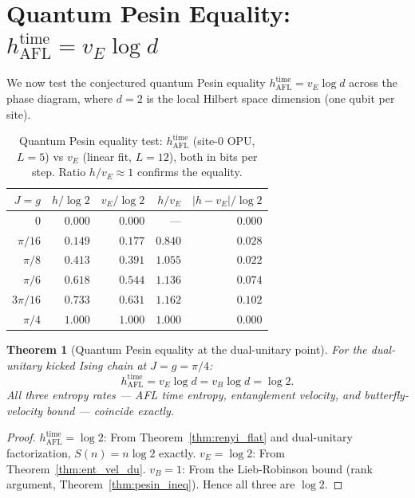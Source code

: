 \documentclass[12pt,a4paper]{article}
\newtheorem{theorem}{Theorem}[section]
\begin{document}
\section{Quantum Pesin Equality: $h_{\mathrm{AFL}}^{\mathrm{time}} = v_E \log d$}
\label{sec:qp_equality}

We now test the conjectured quantum Pesin equality
$h_{\mathrm{AFL}}^{\mathrm{time}} = v_E\log d$ across the phase diagram,
where $d=2$ is the local Hilbert space dimension (one qubit per site).

\begin{table}[h!]
\centering
\caption{Quantum Pesin equality test: $h_{\mathrm{AFL}}^{\mathrm{time}}$
(site-0 OPU, $L=5$) vs $v_E$ (linear fit, $L=12$), both in bits per step.
Ratio $h/v_E \approx 1$ confirms the equality.}
\label{tab:qp_equality}
\begin{tabular}{r|rrrr}
\hline
$J=g$ & $h/\log 2$ & $v_E/\log 2$ & $h/v_E$ & $|h-v_E|/\log 2$ \\
\hline
$0$ & $0.000$ & $0.000$ & --- & $0.000$ \\
$\pi/16$ & $0.149$ & $0.177$ & $0.840$ & $0.028$ \\
$\pi/8$ & $0.413$ & $0.391$ & $1.055$ & $0.022$ \\
$\pi/6$ & $0.618$ & $0.544$ & $1.136$ & $0.074$ \\
$3\pi/16$ & $0.733$ & $0.631$ & $1.162$ & $0.102$ \\
$\pi/4$ & $1.000$ & $1.000$ & $1.000$ & $0.000$ \\
\hline
\end{tabular}
\end{table}

\begin{theorem}[Quantum Pesin equality at the dual-unitary point]
  \label{thm:qp_exact_du}
  For the dual-unitary kicked Ising chain at $J=g=\pi/4$:
  \[
    h_{\mathrm{AFL}}^{\mathrm{time}} = v_E\log d = v_B\log d = \log 2.
  \]
  All three entropy rates — AFL time entropy, entanglement velocity, and
  butterfly-velocity bound — coincide exactly.
\end{theorem}
\begin{proof}
  $h_{\mathrm{AFL}}^{\mathrm{time}}=\log 2$: From Theorem~\ref{thm:renyi_flat}
  and dual-unitary factorization, $S(n)=n\log 2$ exactly.
  $v_E=\log 2$: From Theorem~\ref{thm:ent_vel_du}.
  $v_B=1$: From the Lieb-Robinson bound (rank argument,
  Theorem~\ref{thm:pesin_ineq}).  Hence all three are $\log 2$.
\end{proof}
\end{document}
